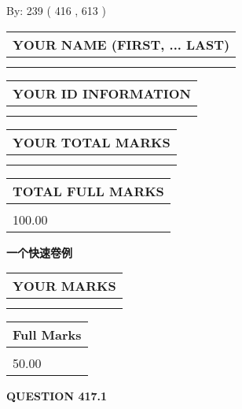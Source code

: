\documentclass{ctexart}
\begin{document}
   
\hspace{1.0in} By: 
 239 ( 416 ,  613 )
   
   
   
   
\newpage 
\setcounter{page}{ 
   417001 } 
   
   
   
   
\noindent\begin{tabular}{|l|}
\hline
YOUR NAME (FIRST, ... LAST)  \\
\hline
 \\ 
 \\ 
\hline
\end{tabular}
\hspace{0.05in} \begin{tabular}{|l|}
\hline
 YOUR   ID   INFORMATION  \\
\hline
 \\ 
 \\ 
\hline
\end{tabular}
   
   
\vspace{0.2in}\noindent\begin{tabular}{|l|}
\hline
YOUR TOTAL MARKS  \\
\hline
 \\ 
 \\ 
\hline
\end{tabular}
\hspace{0.05in} \begin{tabular}{|l|}
\hline
TOTAL FULL MARKS  \\
\hline
 \\ 
100.00 \\
\hline
\end{tabular}
   
   
 \vspace{0.2in}
{\LARGE {\textbf{ 一个快速卷例}}}
   
   
  
\vspace{0.2in}
  
\noindent\begin{tabular}{|l|}
\hline
 YOUR MARKS  \\
\hline
 \\ 
 \\ 
\hline
\end{tabular}
\hspace{0.05in} \begin{tabular}{|l|}
\hline
 Full Marks  \\
\hline
 \\ 
50.00 \\
\hline
\end{tabular}
{\textbf{\Large{QUESTION
417.1 
}}}
  
\end{document}
